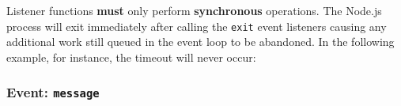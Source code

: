 Listener functions \textbf{must} only perform \textbf{synchronous}
operations. The Node.js process will exit immediately after calling the
\texttt{\textquotesingle{}exit\textquotesingle{}} event listeners
causing any additional work still queued in the event loop to be
abandoned. In the following example, for instance, the timeout will
never occur:

\begin{Shaded}
\begin{Highlighting}[]
   \OperatorTok{;}

\NormalTok{(}\OperatorTok{,}\KeywordTok{=\textgreater{}}\NormalTok{ \{}
  \NormalTok{(() }\KeywordTok{=\textgreater{}}\NormalTok{ \{}
    \NormalTok{(}\NormalTok{)}\OperatorTok{;}
\NormalTok{  \}}\OperatorTok{,} \NormalTok{)}\OperatorTok{;}
\NormalTok{\})}\OperatorTok{;}
\end{Highlighting}
\end{Shaded}

\begin{Shaded}
\begin{Highlighting}[]
  \OperatorTok{=} \NormalTok{(}\NormalTok{)}\OperatorTok{;}

\NormalTok{(}\OperatorTok{,}\KeywordTok{=\textgreater{}}\NormalTok{ \{}
  \NormalTok{(() }\KeywordTok{=\textgreater{}}\NormalTok{ \{}
    \NormalTok{(}\NormalTok{)}\OperatorTok{;}
\NormalTok{  \}}\OperatorTok{,} \NormalTok{)}\OperatorTok{;}
\NormalTok{\})}\OperatorTok{;}
\end{Highlighting}
\end{Shaded}

\subsubsection{\texorpdfstring{Event:
\texttt{\textquotesingle{}message\textquotesingle{}}}{Event: \textquotesingle message\textquotesingle{}}}\label{event-message}

